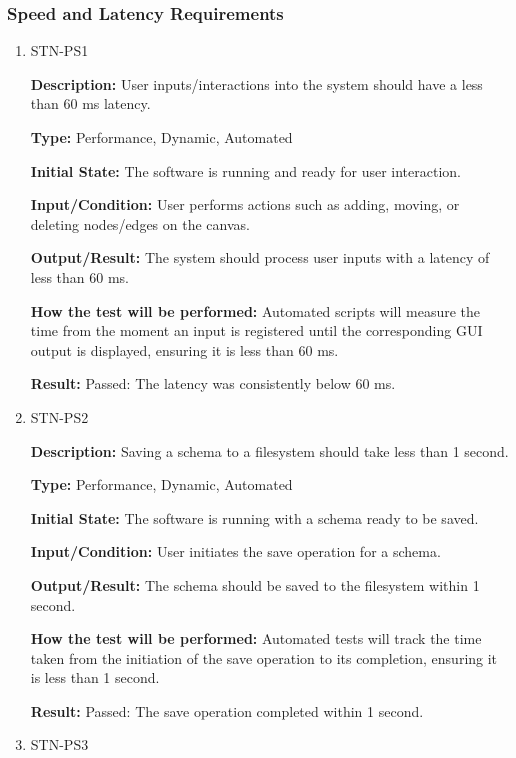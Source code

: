 \documentclass[12pt, titlepage]{article}
\begin{document}
\subsubsection{Speed and Latency Requirements}

\begin{enumerate}

\item{STN-PS1\\}

\textbf{Description:} User inputs/interactions into the system should have a less than 60 ms latency.

\textbf{Type:} Performance, Dynamic, Automated

\textbf{Initial State:} The software is running and ready for user interaction.

\textbf{Input/Condition:} User performs actions such as adding, moving, or deleting nodes/edges on the canvas.

\textbf{Output/Result:} The system should process user inputs with a latency of less than 60 ms.

\textbf{How the test will be performed:} Automated scripts will measure the time from the moment an input is registered until the corresponding GUI output is displayed, ensuring it is less than 60 ms.

\textbf{Result:} Passed: The latency was consistently below 60 ms.

\item{STN-PS2\\}

\textbf{Description:} Saving a schema to a filesystem should take less than 1 second.

\textbf{Type:} Performance, Dynamic, Automated

\textbf{Initial State:} The software is running with a schema ready to be saved.

\textbf{Input/Condition:} User initiates the save operation for a schema.

\textbf{Output/Result:} The schema should be saved to the filesystem within 1 second.

\textbf{How the test will be performed:} Automated tests will track the time taken from the initiation of the save operation to its completion, ensuring it is less than 1 second.

\textbf{Result:} Passed: The save operation completed within 1 second.

\item{STN-PS3\\}


\end{enumerate}
\end{document}

